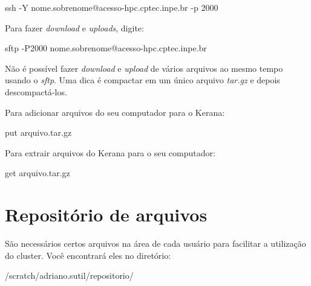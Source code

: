 \begin{bashcode}
ssh -Y nome.sobrenome@acesso-hpc.cptec.inpe.br -p 2000
\end{bashcode}
\bigskip

\noindent Para fazer \textit{download} e \textit{uploads}, digite:
\bigskip

\begin{bashcode}
sftp -P2000 nome.sobrenome@acesso-hpc.cptec.inpe.br
\end{bashcode}
\bigskip

\begin{tcolorbox}[enhanced,
  grow to left by   = 0cm,
  grow to right by  = 0cm,
  enlarge top by    = 0cm,
  enlarge bottom by = 0cm,
  tcbox raise base,
  boxrule           = 1.0pt,
  left              = 18mm,
  colframe          = red!50!black,coltext=red!25!black,colback=red!10!white,
  overlay           = {\begin{tcbclipinterior}\fill[red!75!blue!50!white] (frame.south west)
    rectangle node[text=white,font=\sffamily\bfseries\footnotesize,rotate=0] {ATENÇÃO} ([xshift=18mm]frame.north west);\end{tcbclipinterior}}]
Não é possível fazer \textit{download} e \textit{upload} de vários arquivos ao mesmo tempo usando o \textit{sftp}. Uma dica é compactar em um único arquivo \textit{tar.gz} e depois descompactá-los.
\end{tcolorbox}
\bigskip

\noindent Para adicionar arquivos do seu computador para o Kerana:
\bigskip

\begin{bashcode}
put arquivo.tar.gz
\end{bashcode}
\bigskip

\noindent Para extrair arquivos do Kerana para o seu computador:
\bigskip

\begin{bashcode}
get arquivo.tar.gz
\end{bashcode}
\bigskip

\section{Repositório de arquivos}\label{reposit}
\bigskip

\noindent São necessários certos arquivos na área de cada usuário para facilitar a utilização do cluster. Você encontrará eles no diretório:
\bigskip

\begin{bashcode}
/scratch/adriano.sutil/repositorio/
\end{bashcode}
\bigskip

